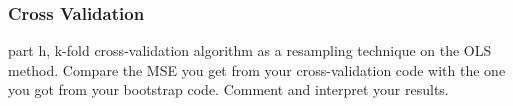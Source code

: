 \documentclass[amssymb,twocolumn,aps]{revtex4}
\begin{document}
\subsubsection{Cross Validation}
part h, k-fold cross-validation algorithm as a resampling technique on the OLS method. Compare the MSE you get from your cross-validation code with the one you got from your bootstrap code.
Comment and interpret your results.

\end{document}
